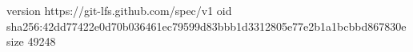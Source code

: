 version https://git-lfs.github.com/spec/v1
oid sha256:42dd77422e0d70b036461ec79599d83bbb1d3312805e77e2b1a1bcbbd867830e
size 49248
